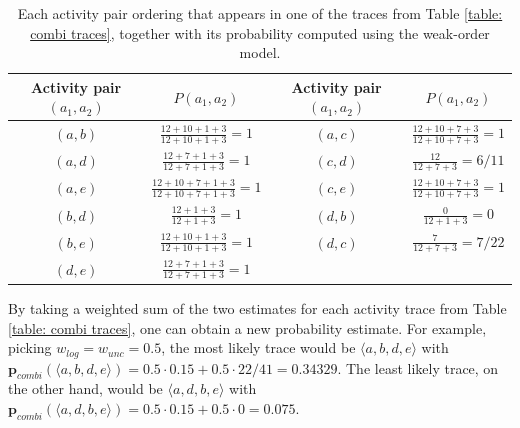 % 
%
%
%
%
%
%
%
\begin{table}[h]

	\centering
	\begin{tabular}{cccc}
		\textbf{Activity pair $(a_1,a_2)$} & \textbf{$P(a_1,a_2)$} & \textbf{Activity pair $(a_1,a_2)$} & \textbf{$P(a_1,a_2)$}
		\\ \hline
	\multicolumn{1}{|c|}{$(a,b)$} & 
	\multicolumn{1}{|c|}{$\frac{12+10+1+3}{12+10+1+3} = 1$} & 
	\multicolumn{1}{|c|}{$(a,c)$} &
	\multicolumn{1}{|c|}{$\frac{12+10+7+3}{12+10+7+3} = 1$}
\\ \hline
	\multicolumn{1}{|c|}{$(a,d)$} & 
	\multicolumn{1}{|c|}{$\frac{12+7+1+3}{12+7+1+3} = 1$} & 
	\multicolumn{1}{|c|}{$(c,d)$} &
	\multicolumn{1}{|c|}{$\frac{12}{12+7+3} = 6/11$}
\\ \hline
	\multicolumn{1}{|c|}{$(a,e)$} & 
	\multicolumn{1}{|c|}{$\frac{12+10+7+1+3}{12+10+7+1+3} = 1$} & 
	\multicolumn{1}{|c|}{$(c,e)$} &
	\multicolumn{1}{|c|}{$\frac{12+10+7+3}{12+10+7+3} = 1$}
\\ \hline
	\multicolumn{1}{|c|}{$(b,d)$} & 
	\multicolumn{1}{|c|}{$\frac{12+1+3}{12+1+3} = 1$} & 
	\multicolumn{1}{|c|}{$(d,b)$} &
	\multicolumn{1}{|c|}{$\frac{0}{12+1+3} = 0$}
\\ \hline
	\multicolumn{1}{|c|}{$(b,e)$} & 
	\multicolumn{1}{|c|}{$\frac{12+10+1+3}{12+10+1+3} = 1$} & 
	\multicolumn{1}{|c|}{$(d,c)$} &
	\multicolumn{1}{|c|}{$\frac{7}{12+7+3} = 7/22$}
\\ \hline
	\multicolumn{1}{|c|}{$(d,e)$} & 
	\multicolumn{1}{|c|}{$\frac{12+7+1+3}{12+7+1+3} = 1$} & 
	\multicolumn{1}{|c|}{} &
	\multicolumn{1}{|c|}{}
\\ \hline


	\end{tabular}
	\caption{Each activity pair ordering that appears in one of the traces from Table \ref{table: combi traces}, together with its probability computed using the weak-order model.}
	\label{table: combi pairs}
\end{table} 
% 
%
%
\newline
By taking a weighted sum of the two estimates for each activity trace from Table \ref{table: combi traces}, one can obtain a new probability estimate.
For example, picking $w_{log} = w_{unc} = 0.5$, the most likely trace would be $\langle a,b,d,e \rangle$ with $\textbf{p}_{combi}(\langle a,b,d,e \rangle) = 0.5 \cdot 0.15 + 0.5 \cdot 22/41 = 0.34329$.
The least likely trace, on the other hand, would be $\langle a,d,b,e \rangle$ with $\textbf{p}_{combi}(\langle a,d,b,e \rangle) = 0.5 \cdot 0.15 + 0.5 \cdot 0 = 0.075$.

